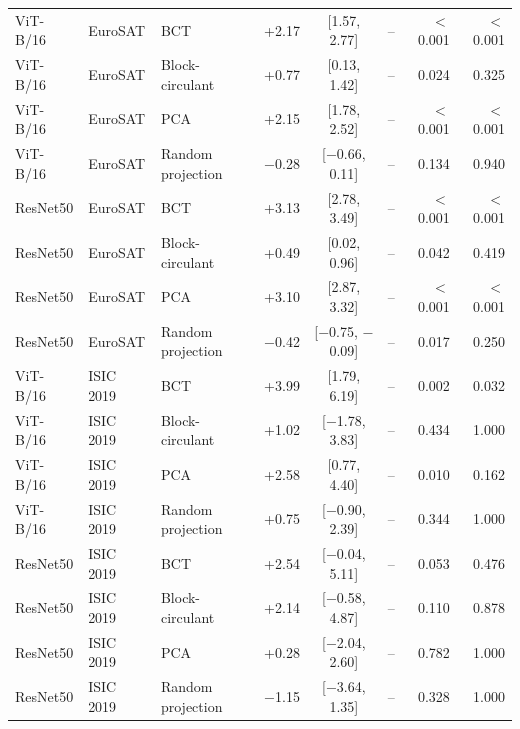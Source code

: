 \documentclass[10pt]{article}
\begin{document}
\begin{longtable}{lllrcrrr}
ViT-B/16 & EuroSAT & BCT & +2.17 & [1.57, 2.77] & -- & $<$0.001 & $<$0.001 \\
ViT-B/16 & EuroSAT & Block-circulant & +0.77 & [0.13, 1.42] & -- & 0.024 & 0.325 \\
ViT-B/16 & EuroSAT & PCA & +2.15 & [1.78, 2.52] & -- & $<$0.001 & $<$0.001 \\
ViT-B/16 & EuroSAT & Random projection & $-$0.28 & [$-$0.66, 0.11] & -- & 0.134 & 0.940 \\
ResNet50 & EuroSAT & BCT & +3.13 & [2.78, 3.49] & -- & $<$0.001 & $<$0.001 \\
ResNet50 & EuroSAT & Block-circulant & +0.49 & [0.02, 0.96] & -- & 0.042 & 0.419 \\
ResNet50 & EuroSAT & PCA & +3.10 & [2.87, 3.32] & -- & $<$0.001 & $<$0.001 \\
ResNet50 & EuroSAT & Random projection & $-$0.42 & [$-$0.75, $-$0.09] & -- & 0.017 & 0.250 \\
ViT-B/16 & ISIC 2019 & BCT & +3.99 & [1.79, 6.19] & -- & 0.002 & 0.032 \\
ViT-B/16 & ISIC 2019 & Block-circulant & +1.02 & [$-$1.78, 3.83] & -- & 0.434 & 1.000 \\
ViT-B/16 & ISIC 2019 & PCA & +2.58 & [0.77, 4.40] & -- & 0.010 & 0.162 \\
ViT-B/16 & ISIC 2019 & Random projection & +0.75 & [$-$0.90, 2.39] & -- & 0.344 & 1.000 \\
ResNet50 & ISIC 2019 & BCT & +2.54 & [$-$0.04, 5.11] & -- & 0.053 & 0.476 \\
ResNet50 & ISIC 2019 & Block-circulant & +2.14 & [$-$0.58, 4.87] & -- & 0.110 & 0.878 \\
ResNet50 & ISIC 2019 & PCA & +0.28 & [$-$2.04, 2.60] & -- & 0.782 & 1.000 \\
ResNet50 & ISIC 2019 & Random projection & $-$1.15 & [$-$3.64, 1.35] & -- & 0.328 & 1.000 \\
\end{longtable}
\vspace{-6pt}{\footnotesize Differences in Macro F1 percentage points; $g$, Hedges' $g$ (not defined for the interaction).\par}
\normalsize
\end{document}
